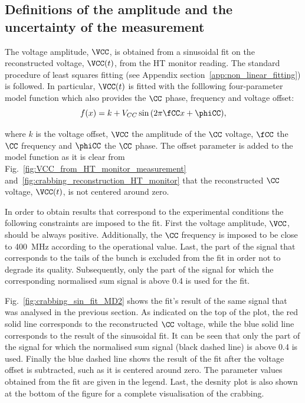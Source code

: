 \subsection{Definitions of the amplitude and the uncertainty of the measurement}\label{subsec:def_amplt_uncertainty}
The voltage amplitude, $\VCC$, is obtained from a sinusoidal fit on the reconstructed voltage, $\VCC (t)$, from the HT monitor reading. The standard procedure of least squares fitting (see Appendix section~\ref{app:non_linear_fitting}) is followed. In particular, $\VCC (t)$ is fitted with the folllowing four-parameter model function which also provides the $\CC$ phase, frequency and voltage offset:
\begin{equation}\label{eq:sin_fit_cc}
   f(x) = k + V_{CC}\sin{(2\pi \fCC x + \phiCC)},
\end{equation}

where $k$ is the voltage offset, $\VCC$ the amplitude of the $\CC$ voltage, $\fCC$ the $\CC$ frequency and $\phiCC$ the $\CC$ phase. The offset parameter is added to the model function as it is clear from Fig.~\ref{fig:VCC_from_HT_monitor_measurement} and~\ref{fig:crabbing_reconstruction_HT_monitor} that the reconstructed $\CC$ voltage, $\VCC(t)$, is not centered around zero.

In order to obtain results that correspond to the experimental conditions the following constraints are imposed to the fit. First the voltage amplitude, $\VCC$, should be always positive. Additionally, the $\CC$ frequency is imposed to be close to 400\, MHz according to the operational value. Last, the part of the signal that corresponds to the tails of the bunch is excluded from the fit in order not to degrade its quality. Subsequently, only the part of the signal for which the corresponding normalised sum signal is above 0.4 is used for the fit. 

Fig.~\ref{fig:crabbing_sin_fit_MD2} shows the fit's result of the same signal that was analysed in the previous section. As indicated on the top of the plot, the red solid line corresponds to the reconstructed $\CC$ voltage, while the blue solid line corresponds to the result of the sinusoidal fit. It can be seen that only the part of the signal for which the normalised sum signal (black dashed line) is above 0.4 is used. Finally the blue dashed line shows the result of the fit after the voltage offset is subtracted, such as it is centered around zero. The parameter values obtained from the fit are given in the legend. Last, the desnity plot is also shown at the bottom of the figure for a complete visualisation of the crabbing. 

